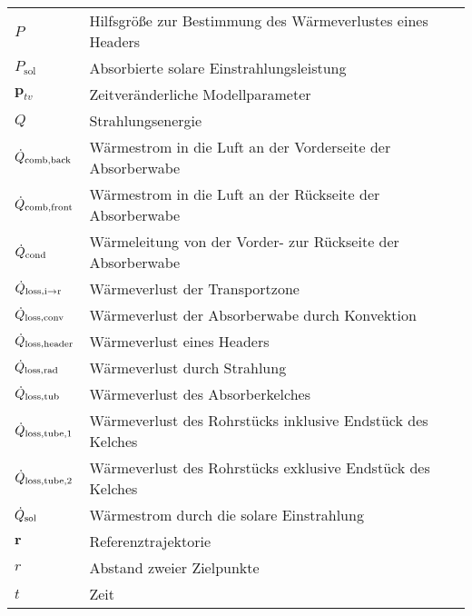 \begin{longtable}{p{}p{}}
    $P$                              & Hilfsgröße zur Bestimmung des Wärmeverlustes eines Headers       \\
    $P_{\mathrm{sol}}$               & Absorbierte solare Einstrahlungsleistung                         \\
    $\boldsymbol{p}_{tv}$            & Zeitveränderliche Modellparameter                                \\
    $Q$                              & Strahlungsenergie                                                \\
    $\dot{Q}_{\mathrm{comb,back}}$          & Wärmestrom in die Luft an der Vorderseite der Absorberwabe       \\
    $\dot{Q}_{\mathrm{comb,front}}$         & Wärmestrom in die Luft an der Rückseite der Absorberwabe         \\
    $\dot{Q}_{\mathrm{cond}}$                & Wärmeleitung von der Vorder- zur Rückseite der Absorberwabe      \\
    $\dot{Q}_{\mathrm{loss,i \to r}}$   & Wärmeverlust der Transportzone                                   \\
    $\dot{Q}_{\mathrm{loss,conv}}$ & Wärmeverlust der Absorberwabe durch Konvektion                   \\
    $\dot{Q}_{\mathrm{loss,header}}$              & Wärmeverlust eines Headers                                       \\
    $\dot{Q}_{\mathrm{loss,rad}}$  & Wärmeverlust durch Strahlung                                     \\
    $\dot{Q}_{\mathrm{loss,tub}}$                 & Wärmeverlust des Absorberkelches                                 \\
    $\dot{Q}_{\mathrm{loss,tube,1}}$              & Wärmeverlust des Rohrstücks inklusive Endstück des Kelches       \\
    $\dot{Q}_{\mathrm{loss,tube,2}}$              & Wärmeverlust des Rohrstücks exklusive Endstück des Kelches       \\
    $\dot{Q}_{\mathrm{sol}}$                       & Wärmestrom durch die solare Einstrahlung                         \\
    $\boldsymbol{r}$                 & Referenztrajektorie                                              \\
    $r$                              & Abstand zweier Zielpunkte                                        \\
    $t$                              & Zeit                                                             \\

\end{longtable}
